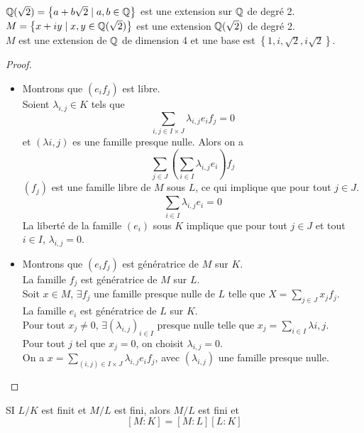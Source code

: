 \begin{example}
	$\mathbb{Q}(\sqrt{2}) = \left\{ a + b\sqrt{2} \mid a,b \in \mathbb{Q} \right\}$ est une extension sur $\mathbb{Q}$ de degré 2.\\
	$M = \left\{ x + iy \mid x,y \in \mathbb{Q}(\sqrt{2}) \right\}$ est une extension $\mathbb{Q}(\sqrt{2})$ de degré 2.\\
	$M$ est une extension de $\mathbb{Q}$ de dimension 4 et une base est $\left\{ 1, i , \sqrt{2}, i\sqrt{2}\right\}$.
\end{example}


\begin{proof}
	\begin{itemize}
		\item Montrons que $(e_if_j)$ est libre. \\ %
		      Soient $\lambda_{i,j} \in K$ tels que
		      $$ \sum\limits_{i,j \in I \times J} \lambda_{i,j} e_i f_j = 0$$
		      et $(\lambda{i,j})$ es une famille presque nulle. Alors  on a
		      $$ \sum\limits_{j \in J} \left( \sum\limits_{i \in I} \lambda_{i,j} e_i \right) f_j $$
		      $(f_j)$ est une famille libre de $M$ sous $L$, ce qui implique que pour tout $j \in J$.
		      $$ \sum\limits_{i\in I } \lambda_{i,j} e_i = 0$$
		      La liberté de la famille $(e_i)$ sous $K$ implique que pour tout $j \in J$ et tout $i \in I$, $\lambda_{i,j} = 0$.
		\item Montrons que $(e_if_j)$  est génératrice de $M$ sur $K$.\\
		      La famille $f_j$ est génératrice de $M$ sur $L$.\\
		      Soit $x \in M$, $\exists f_j$ une famille presque nulle de $L$ telle que $X = \sum\limits_{j\in J} x_j f_j$.\\
		      La famille $e_i$ est génératrice de $L$ sur $K$.\\
		      Pour tout $x_j \neq 0 $, $\exists (\lambda_{i,j})_{i \in I}$ presque nulle telle que $x_j = \sum\limits_{i \in I} \lambda{i,j}$.\\
		      Pour tout $j$ tel que $x_j = 0$, on choisit $\lambda_{i,j} = 0$. \\
		      On a $x = \sum\limits_{(i,j)\in I\times J} \lambda_{i,j} e_i f_j$, avec $(\lambda_{i,j})$ une famille presque nulle.
	\end{itemize}
\end{proof}


\begin{coro}[important]
	SI $L / K$ est finit et $M/L$ est fini, alors $M/L$ est fini et
	$$ [M:K] = [M:L] [L:K] $$
\end{coro}


